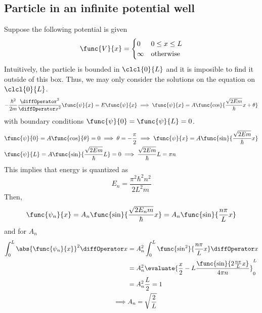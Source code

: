 \subsection{Particle in an infinite potential well}
Suppose the following potential is given
\begin{equation*}
    \func{V}{x} = \begin{cases}
        0      & 0 \leq x \leq L  \\
        \infty & \text{otherwise}
    \end{cases}
\end{equation*}
Intuitively, the particle is bounded in \(\clcl{0}{L}\) and it is imposible to find it outside of this box. Thus, we may only consider the solutions on the equation on \(\clcl{0}{L}\).
\begin{equation*}
    -\frac{\hbar^2}{2m} \dfrac{\diffOperator^2}{\diffOperator x^2} \func{\psi}{x} = E \func{\psi}{x} \implies \func{\psi}{x} = A \func{\cos}{\dfrac{\sqrt{2Em}}{\hbar} x + \theta}
\end{equation*}
with boundary conditions \(\func{\psi}{0} = \func{\psi}{L} = 0\).
\begin{align*}
     & \func{\psi}{0} = A \func{\cos}{\theta} = 0 \implies \theta = -\frac{\pi}{2} \implies \func{\psi}{x} = A \func{\sin}{\dfrac{\sqrt{2Em}}{\hbar} x} \\
     & \func{\psi}{L} = A \func{\sin}{\dfrac{\sqrt{2Em}}{\hbar} L} = 0 \implies \dfrac{\sqrt{2Em}}{\hbar}L = \pi n
\end{align*}
This implies that energy is quantized as
\begin{equation*}
    E_n = \dfrac{\pi^2 \hbar^2 n^2}{2L^2m}
\end{equation*}
Then,
\begin{equation*}
    \func{\psi_n}{x} = A_n \func{\sin}{\dfrac{\sqrt{2E_n m}}{\hbar} x} = A_n \func{\sin}{\dfrac{n \pi}{L} x}
\end{equation*}
and for \(A_n\)
\begin{align*}
    \int_{0}^L \abs{\func{\psi_n}{x}}^2 \diffOperator x & =  A_n^2 \int_{0}^L \func{\sin^2}{\dfrac{n \pi}{L} x}\diffOperator x                         \\
                                                        & = A_n^2 \evaluate{\dfrac{x}{2} - L\dfrac{\func{\sin}{2 \frac{n \pi}{L} x }}{4 \pi n} }_{0}^L \\
                                                        & = A_n^2 \frac{L}{2} = 1                                                                      \\
    \implies                                            & A_n = \sqrt{\frac{2}{L}}
\end{align*}
